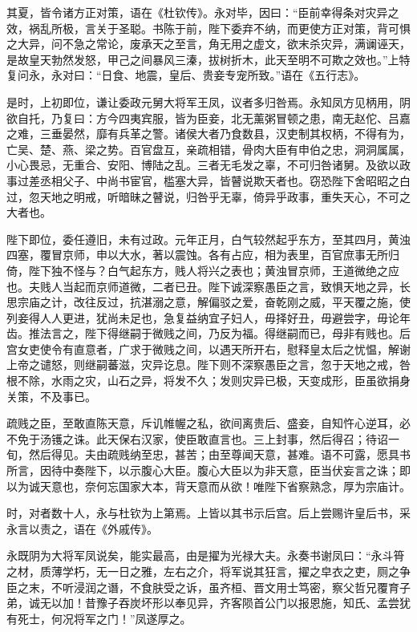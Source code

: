 \documentclass[12pt,UTF8]{ctexbook}
\begin{document}
其夏，皆令诸方正对策，语在《杜钦传》。永对毕，因曰：“臣前幸得条对灾异之效，祸乱所极，言关于圣聪。书陈于前，陛下委弃不纳，而更使方正对策，背可惧之大异，问不急之常论，废承天之至言，角无用之虚文，欲末杀灾异，满谰诬天，是故皇天勃然发怒，甲己之间暴风三溱，拔树折木，此天至明不可欺之效也。”上特复问永，永对曰：“日食、地震，皇后、贵妾专宠所致。”语在《五行志》。



是时，上初即位，谦让委政元舅大将军王凤，议者多归咎焉。永知凤方见柄用，阴欲自托，乃复曰：方今四夷宾服，皆为臣妾，北无薰粥冒顿之患，南无赵佗、吕嘉之难，三垂晏然，靡有兵革之警。诸侯大者乃食数县，汉吏制其权柄，不得有为，亡吴、楚、燕、梁之势。百官盘互，亲疏相错，骨肉大臣有申伯之忠，洞洞属属，小心畏忌，无重合、安阳、博陆之乱。三者无毛发之辜，不可归咎诸舅。及欲以政事过差丞相父子、中尚书宦官，槛塞大异，皆瞽说欺天者也。窃恐陛下舍昭昭之白过，忽天地之明戒，听暗昧之瞽说，归咎乎无辜，倚异乎政事，重失天心，不可之大者也。



陛下即位，委任遵旧，未有过政。元年正月，白气较然起乎东方，至其四月，黄浊四塞，覆冒京师，申以大水，著以震蚀。各有占应，相为表里，百官庶事无所归倚，陛下独不怪与？白气起东方，贱人将兴之表也；黄浊冒京师，王道微绝之应也。夫贱人当起而京师道微，二者已丑。陛下诚深察愚臣之言，致惧天地之异，长思宗庙之计，改往反过，抗湛溺之意，解偏驳之爱，奋乾刚之威，平天覆之施，使列妾得人人更进，犹尚未足也，急复益纳宜子妇人，毋择好丑，毋避尝字，毋论年齿。推法言之，陛下得继嗣于微贱之间，乃反为福。得继嗣而已，母非有贱也。后宫女吏使令有直意者，广求于微贱之间，以遇天所开右，慰释皇太后之忧愠，解谢上帝之谴怒，则继嗣蕃滋，灾异讫息。陛下则不深察愚臣之言，忽于天地之戒，咎根不除，水雨之灾，山石之异，将发不久；发则灾异已极，天变成形，臣虽欲捐身关策，不及事已。



疏贱之臣，至敢直陈天意，斥讥帷幄之私，欲间离贵后、盛妾，自知忤心逆耳，必不免于汤镬之诛。此天保右汉家，使臣敢直言也。三上封事，然后得召；待诏一旬，然后得见。夫由疏贱纳至忠，甚苦；由至尊闻天意，甚难。语不可露，愿具书所言，因待中奏陛下，以示腹心大臣。腹心大臣以为非天意，臣当伏妄言之诛；即以为诚天意也，奈何忘国家大本，背天意而从欲！唯陛下省察熟念，厚为宗庙计。



时，对者数十人，永与杜钦为上第焉。上皆以其书示后宫。后上尝赐许皇后书，采永言以责之，语在《外戚传》。



永既阴为大将军凤说矣，能实最高，由是擢为光禄大夫。永奏书谢凤曰：“永斗筲之材，质薄学朽，无一日之雅，左右之介，将军说其狂言，擢之皁衣之吏，厕之争臣之末，不听浸润之谮，不食肤受之诉，虽齐桓、晋文用士笃密，察父哲兄覆育子弟，诚无以加！昔豫子吞炭坏形以奉见异，齐客陨首公门以报恩施，知氏、孟尝犹有死士，何况将军之门！”凤遂厚之。
\end{document}
